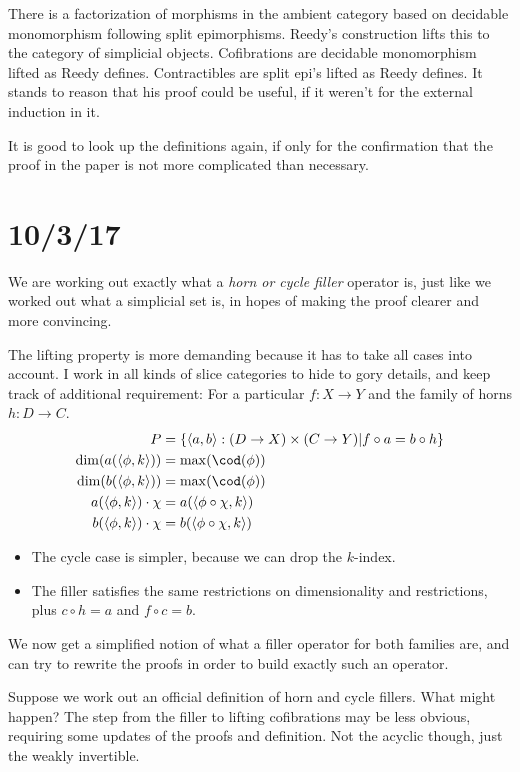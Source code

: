 \documentclass{tac}
\newcommand\set[1]{\left\{#1\right\}}
\newcommand\of{:}
\newcommand\tuplet[1]{\left\langle #1 \right\rangle}
\begin{document}
There is a factorization of morphisms in the ambient category based on decidable monomorphism following split epimorphisms.
Reedy's construction lifts this to the category of simplicial objects.
Cofibrations are decidable monomorphism lifted as Reedy defines.
Contractibles are split epi's lifted as Reedy defines.
It stands to reason that his proof could be useful, if it weren't for the external induction in it.

It is good to look up the definitions again, if only for the confirmation that the proof in the paper is not more complicated than necessary.

\section{10/3/17}
We are working out exactly what a \emph{horn or cycle filler} operator is, just like we worked out what a simplicial set is, in hopes of making the proof clearer and more convincing.

The lifting property is more demanding because it has to take all cases into account.
I work in all kinds of slice categories to hide to gory details, and keep track of additional requirement:
For a particular $f\of X\to Y$ and the family of horns $h\of D\to C$.
\begin{align*}
P &= \set{ \tuplet{a,b}\of(D\to X)\times(C\to Y)| f\circ a = b \circ h }\\
\dim(a(\tuplet{\phi,k})) &=\max(\cod(\phi))\\
\dim(b(\tuplet{\phi,k})) &= \max(\cod(\phi))\\
a(\tuplet{\phi,k})\cdot\chi &= a(\tuplet{\phi\circ \chi,k}) \\
b(\tuplet{\phi,k})\cdot\chi &= b(\tuplet{\phi\circ \chi,k}) \\
\end{align*}
\begin{itemize}
\item The cycle case is simpler, because we can drop the $k$-index.
\item The filler satisfies the same restrictions on dimensionality and restrictions, plus $c\circ h = a$ and $f\circ c = b$.
\end{itemize}

We now get a simplified notion of what a filler operator for both families are, and can try to rewrite the proofs in order to build exactly such an operator.

Suppose we work out an official definition of horn and cycle fillers. What might happen?
The step from the filler to lifting cofibrations may be less obvious, requiring some updates of the proofs and definition.
Not the acyclic though, just the weakly invertible.
\end{document}
